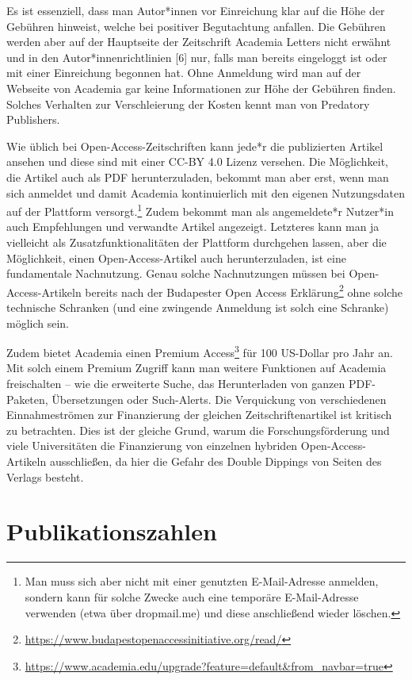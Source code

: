 \documentclass[a4paper,
fontsize=11pt,
oneside,
numbers=noperiodatend,
parskip=half-,
bibliography=totoc,
final
]{scrartcl}
\begin{document}
Es ist essenziell, dass man Autor*innen vor Einreichung klar auf die
Höhe der Gebühren hinweist, welche bei positiver Begutachtung anfallen.
Die Gebühren werden aber auf der Hauptseite der Zeitschrift Academia
Letters nicht erwähnt und in den Autor*innenrichtlinien {[}6{]} nur,
falls man bereits eingeloggt ist oder mit einer Einreichung begonnen
hat. Ohne Anmeldung wird man auf der Webseite von Academia gar keine
Informationen zur Höhe der Gebühren finden. Solches Verhalten zur
Verschleierung der Kosten kennt man von Predatory Publishers.

Wie üblich bei Open-Access-Zeitschriften kann jede*r die publizierten
Artikel ansehen und diese sind mit einer CC-BY 4.0 Lizenz versehen. Die
Möglichkeit, die Artikel auch als PDF herunterzuladen, bekommt man aber
erst, wenn man sich anmeldet und damit Academia kontinuierlich mit den
eigenen Nutzungsdaten auf der Plattform versorgt.\footnote{Man muss sich
  aber nicht mit einer genutzten E-Mail-Adresse anmelden, sondern kann
  für solche Zwecke auch eine temporäre E-Mail-Adresse verwenden (etwa
  über dropmail.me) und diese anschließend wieder löschen.} Zudem
bekommt man als angemeldete*r Nutzer*in auch Empfehlungen und verwandte
Artikel angezeigt. Letzteres kann man ja vielleicht als
Zusatzfunktionalitäten der Plattform durchgehen lassen, aber die
Möglichkeit, einen Open-Access-Artikel auch herunterzuladen, ist eine
fundamentale Nachnutzung. Genau solche Nachnutzungen müssen bei
Open-Access-Artikeln bereits nach der Budapester Open Access
Erklärung\footnote{\url{https://www.budapestopenaccessinitiative.org/read/}}
ohne solche technische Schranken (und eine zwingende Anmeldung ist solch
eine Schranke) möglich sein.

Zudem bietet Academia einen Premium Access\footnote{\url{https://www.academia.edu/upgrade?feature=default\&from_navbar=true}}
für 100 US-Dollar pro Jahr an. Mit solch einem Premium Zugriff kann man
weitere Funktionen auf Academia freischalten -- wie die erweiterte
Suche, das Herunterladen von ganzen PDF-Paketen, Übersetzungen oder
Such-Alerts. Die Verquickung von verschiedenen Einnahmeströmen zur
Finanzierung der gleichen Zeitschriftenartikel ist kritisch zu
betrachten. Dies ist der gleiche Grund, warum die Forschungsförderung
und viele Universitäten die Finanzierung von einzelnen hybriden
Open-Access-Artikeln ausschließen, da hier die Gefahr des Double
Dippings von Seiten des Verlags besteht.

\hypertarget{publikationszahlen}{%
\section{Publikationszahlen}\label{publikationszahlen}}
\end{document}
